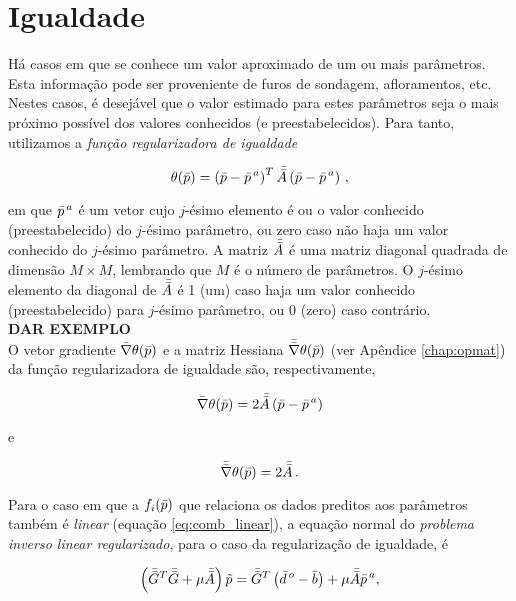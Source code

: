 \section{Igualdade}

Há casos em que se conhece um valor aproximado de um ou mais parâmetros.
Esta informação pode ser proveniente de furos de sondagem, afloramentos, etc.
Nestes casos, é desejável que o valor estimado para estes parâmetros seja o mais
próximo possível dos valores conhecidos (e preestabelecidos).
Para tanto, utilizamos a {\it função regularizadora de igualdade}

\begin{equation}
\theta(\bar{p}) =
    \left(\bar{p} - \bar{p}^{\thinspace a}\right)^T \bar{\bar{A}}
        \left(\bar{p} - \bar{p}^{\thinspace a} \right)
    \thinspace ,
\label{eq:igualdade}
\end{equation}

\noindent em que $\bar{p}^{\thinspace a}$ é um vetor cujo $j$-ésimo elemento é
ou o valor conhecido (preestabelecido) do $j$-ésimo parâmetro, ou zero caso não
haja um valor conhecido do $j$-ésimo parâmetro. A matriz $\bar{\bar{A}}$ é uma matriz
diagonal quadrada de dimensão $M \times M$, lembrando que $M$ é o número de
parâmetros.
O $j$-ésimo elemento da diagonal de $\bar{\bar{A}}$ é 1 (um) caso
haja um valor conhecido (preestabelecido) para $j$-ésimo parâmetro, ou 0 (zero)
caso contrário.
\\
{\bf DAR EXEMPLO}
\\
\indent O vetor gradiente $\bar{\nabla}\theta(\bar{p})$ e a matriz Hessiana
$\bar{\bar{\nabla}}\theta(\bar{p})$ (ver Apêndice \ref{chap:opmat}) da função
regularizadora de igualdade são, respectivamente,

\begin{equation}
\bar{\nabla}\theta(\bar{p}) = 2\bar{\bar{A}}
    \left(\bar{p} - \bar{p}^{\thinspace a} \right)
\end{equation}

\noindent e

\begin{equation}
\bar{\bar{\nabla}}\theta(\bar{p}) = 2\bar{\bar{A}} \thinspace .
\end{equation}

\indent Para o caso em que a $f_i(\bar{p})$ que relaciona
os dados preditos aos parâmetros também é {\it linear} (equação \ref{eq:comb_linear}),
a equação normal do {\it problema inverso linear regularizado},
para o caso da regularização de igualdade, é

\begin{equation}
\left(\bar{\bar{G}}^T\bar{\bar{G}} + \mu\bar{\bar{A}}\right)\tilde{p} =
    \bar{\bar{G}}^T\left(\bar{d}^{\thinspace o} - \bar{b} \right) +
    \mu\bar{\bar{A}}\bar{p}^{\thinspace a} ,
\end{equation}

